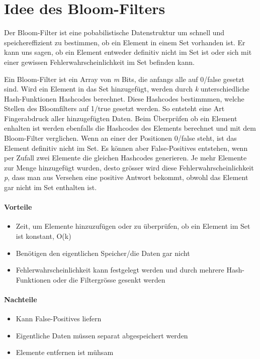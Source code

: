\documentclass[12pt]{article}
\begin{document}
\maketitle

\section{Idee des Bloom-Filters}
Der Bloom-Filter ist eine pobabilistische Datenstruktur um schnell und speichereffizient zu bestimmen, ob ein Element in einem Set vorhanden ist. Er kann uns sagen, ob ein Element entweder definitiv nicht im Set ist oder sich mit einer gewissen Fehlerwahrscheinlichkeit im Set befinden kann.

Ein Bloom-Filter ist ein Array von \textit{m} Bits, die anfangs alle auf 0/false gesetzt sind. Wird ein Element in das Set hinzugefügt, werden durch \textit{k} unterschiedliche Hash-Funktionen Hashcodes berechnet. Diese Hashcodes bestimmmen, welche Stellen des Bloomfilters auf 1/true gesetzt werden. So entsteht eine Art Fingerabdruck aller hinzugefügten Daten. Beim Überprüfen ob ein Element enhalten ist werden ebenfalls die Hashcodes des Elements berechnet und mit dem Bloom-Filter verglichen. Wenn an einer der Positionen 0/false steht, ist das Element definitiv nicht im Set. Es können aber False-Positives entstehen, wenn per Zufall zwei Elemente die gleichen Hashcodes generieren. Je mehr Elemente zur Menge hinzugefügt wurden, desto grösser wird diese Fehlerwahrscheinlichkeit \textit{p}, dass man aus Versehen eine positive Antwort bekommt, obwohl das Element gar nicht im Set enthalten ist.


\paragraph{Vorteile}
\begin{itemize}
\item Zeit, um Elemente hinzuzufügen oder zu überprüfen, ob ein Element im Set ist konstant, O(k)
\item Benötigen den eigentlichen Speicher/die Daten gar nicht
\item Fehlerwahrscheinlichkeit kann festgelegt werden und durch mehrere Hash-Funktionen oder die Filtergrösse gesenkt werden
\end{itemize}

\paragraph{Nachteile}
\begin{itemize}
\item Kann False-Positives liefern
\item Eigentliche Daten müssen separat abgespeichert werden
\item Elemente entfernen ist mühsam
\end{itemize}
\end{document}
